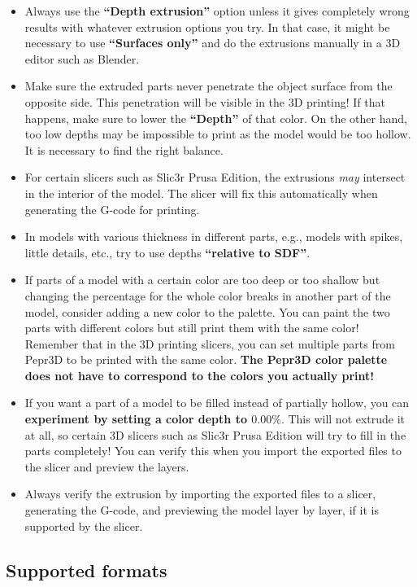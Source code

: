 \begin{itemize}
\item Always use the \textbf{``Depth extrusion''} option unless it gives completely wrong results with whatever extrusion options you try. In that case, it might be necessary to use \textbf{``Surfaces only''} and do the extrusions manually in a 3D editor such as Blender.
\item Make sure the extruded parts never penetrate the object surface from the opposite side. This penetration will be visible in the 3D printing! If that happens, make sure to lower the \textbf{``Depth''} of that color. On the other hand, too low depths may be impossible to print as the model would be too hollow. It is necessary to find the right balance.
\item For certain slicers such as Slic3r Prusa Edition, the extrusions \emph{may} intersect in the interior of the model. The slicer will fix this automatically when generating the G-code for printing.
\item In models with various thickness in different parts, e.g., models with spikes, little details, etc., try to use depths \textbf{``relative to SDF''}.
\item If parts of a model with a certain color are too deep or too shallow but changing the percentage for the whole color breaks in another part of the model, consider adding a new color to the palette. You can paint the two parts with different colors but still print them with the same color! Remember that in the 3D printing slicers, you can set multiple parts from Pepr3D to be printed with the same color. \textbf{The Pepr3D color palette does not have to correspond to the colors you actually print!}
\item If you want a part of a model to be filled instead of partially hollow, you can \textbf{experiment by setting a color depth to $0.00\%$}. This will not extrude it at all, so certain 3D slicers such as Slic3r Prusa Edition will try to fill in the parts completely! You can verify this when you import the exported files to the slicer and preview the layers.
\item Always verify the extrusion by importing the exported files to a slicer, generating the G-code, and previewing the model layer by layer, if it is supported by the slicer.
\end{itemize}


\subsection{Supported formats}
\label{sec:exportformats}

